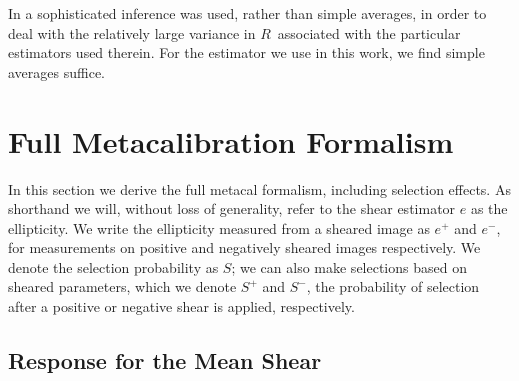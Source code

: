 \documentclass[a4paper,fleqn,usenatbib]{mnras}
\newcommand{\mest}{e}
\newcommand{\mcalR}{$R$}
\newcommand{\mcalRpsf}{$R^{p}$}
\begin{document}

In \cite{HuffMcal} a sophisticated inference was used, rather than simple
averages, in order to deal with the relatively large variance in \mcalR\
associated with the particular estimators used therein.  For the estimator
we use in this work, we find simple averages suffice.


\section{Full Metacalibration Formalism} \label{sec:selection}


In this section we derive the full metacal formalism, including selection
effects. As shorthand we will, without loss of generality, refer to the shear
estimator $\mest$ as the ellipticity. We write the ellipticity measured from a
sheared image as $\mest^+$ and $\mest^-$, for measurements on positive and
negatively sheared images respectively.  We denote the selection probability as
$S$;  we can also make selections based on sheared parameters, which we denote
$S^+$ and $S^-$, the probability of selection after a positive or negative
shear is applied, respectively.


\subsection{Response for the Mean Shear} \label{sec:Rmean}
\end{document}
